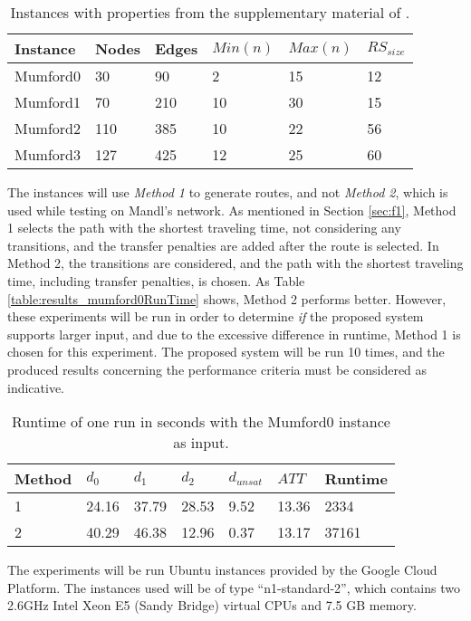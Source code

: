 \begin{table}[H]
	\centering
	\begin{tabular}{|l|l|l|l|l|l|}
    	\hline
    	\textbf{Instance} & \textbf{Nodes}&\textbf{Edges} & $Min(n)$ & $Max(n)$ & $RS_{size}$\\
    	\hline
   	    Mumford0 & 30&90 & 2&15 & 12 \\
   	    Mumford1 & 70&210 & 10&30 & 15 \\
   	    Mumford2 & 110&385 & 10&22 & 56 \\
   	    Mumford3 & 127&425 & 12&25 & 60 \\
   	    \hline
    \end{tabular}
    \caption{Instances with properties from the supplementary material of \citet{mumford13}.}
    \label{table:dataSet_mumford}
\end{table}

The instances will use \textit{Method 1} to generate routes, and not \textit{Method 2}, which is used while testing on Mandl's network. As mentioned in Section \vref{sec:f1}, Method 1 selects the path with the shortest traveling time, not considering any transitions, and the transfer penalties are added after the route is selected. In Method 2, the transitions are considered, and the path with the shortest traveling time, including transfer penalties, is chosen. As Table \vref{table:results_mumford0RunTime} shows, Method 2 performs better. However, these experiments will be run in order to determine \textit{if} the proposed system supports larger input, and due to the excessive difference in runtime, Method 1 is chosen for this experiment. The proposed system will be run 10 times, and the produced results concerning the performance criteria must be considered as indicative. 

\begin{table}[H]
    \centering
    \begin{tabular}{|l|l|l|l|l|l|l|}
        \hline
        \textbf{Method} & $d_0$ & $d_1$ & $d_2$ & $d_{unsat}$ & $ATT$ & \textbf{Runtime} \\
        \hline
        1 & 24.16 & 37.79 & 28.53 & 9.52 & 13.36 & 2334 \\
        2 & 40.29 & 46.38 & 12.96 & 0.37 & 13.17 & 37161 \\
        \hline
    \end{tabular}
    \caption{Runtime of one run in seconds with the Mumford0 instance as input.}
    \label{table:results_mumford0RunTime}
\end{table}

The experiments will be run Ubuntu instances provided by the Google Cloud Platform\citep{website:google}. The instances used will be of type ``n1-standard-2'', which contains two 2.6GHz Intel Xeon E5 (Sandy Bridge) virtual CPUs and 7.5 GB memory.
